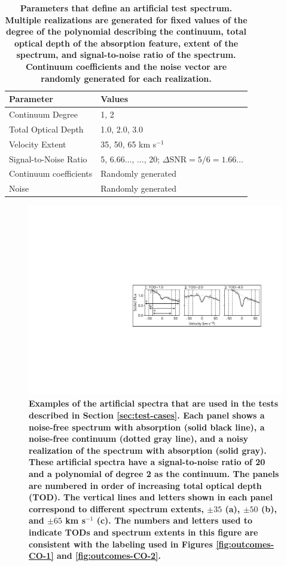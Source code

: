 \documentclass[manuscript]{aastex62}
\begin{document}
\begin{table}
  \centering
\begin{tabular}{ll}
  {\bf Parameter} & {\bf Values} \\
  \hline
  Continuum Degree & 1, 2 \\
  Total Optical Depth & 1.0, 2.0, 3.0 \\
  Velocity Extent & 35, 50, 65 km s$^{-1}$ \\
  Signal-to-Noise Ratio & 5, 6.66$\ldots$, $\ldots$, 20; $\Delta$SNR$=5/6=1.66\ldots$\\
  Continuum coefficients & Randomly generated \\
  Noise & Randomly generated
\end{tabular}
\caption{
{
\bf
Parameters that define an artificial test spectrum.
Multiple realizations are generated for fixed values of the degree of the polynomial describing the continuum, total optical depth of the absorption feature, extent of the spectrum, and signal-to-noise ratio of the spectrum.
Continuum coefficients and the noise vector are randomly generated for each realization.
}
}
\label{tab:artificial-data:params}
\end{table}


\begin{figure}
  \includegraphics[width=\linewidth]{figures/annotated_example_data.pdf}
  \caption{
  \bf
  Examples of the artificial spectra that are used in the tests described in Section \ref{sec:test-cases}.
  Each panel shows a noise-free spectrum with absorption (solid black line), a noise-free continuum (dotted gray line), and a noisy realization of the spectrum with absorption (solid gray).
  These artificial spectra have a signal-to-noise ratio of 20 and a polynomial of degree 2 as the continuum.
  The panels are numbered in order of increasing total optical depth (TOD).
  The vertical lines and letters shown in each panel correspond to different spectrum extents, $\pm 35$ (a), $\pm 50$ (b), and $\pm 65$ km s$^{-1}$ (c).
  The numbers and letters used to indicate TODs and spectrum extents in this figure are consistent with the labeling used in Figures \ref{fig:outcomes-CO-1} and \ref{fig:outcomes-CO-2}.
  }
  \label{fig:artificial-data-eg}
\end{figure}
\end{document}
